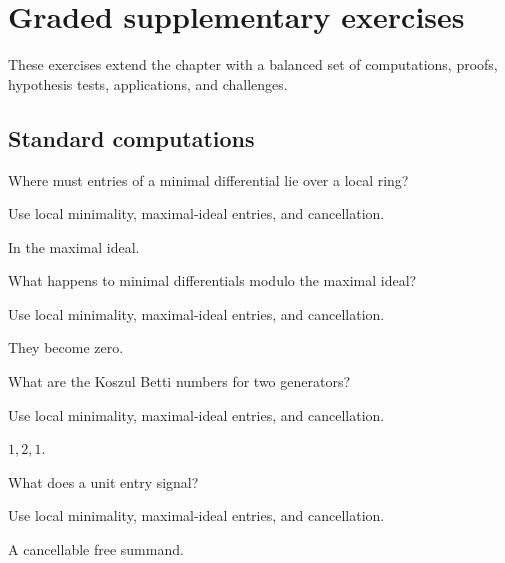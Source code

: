 \section{Graded supplementary exercises}
These exercises extend the chapter with a balanced set of computations, proofs, hypothesis tests, applications, and challenges.

\subsection*{Standard computations}

\begin{exercise}\label{exr:v25-expand-01}
Where must entries of a minimal differential lie over a local ring?
\end{exercise}
\begin{hint}
Use local minimality, maximal-ideal entries, and cancellation.
\end{hint}
\begin{solution}
In the maximal ideal.
\end{solution}

\begin{exercise}[Reduction]\label{exr:v25-expand-02}
What happens to minimal differentials modulo the maximal ideal?
\end{exercise}
\begin{hint}
Use local minimality, maximal-ideal entries, and cancellation.
\end{hint}
\begin{solution}
They become zero.
\end{solution}

\begin{exercise}\label{exr:v25-expand-03}
What are the Koszul Betti numbers for two generators?
\end{exercise}
\begin{hint}
Use local minimality, maximal-ideal entries, and cancellation.
\end{hint}
\begin{solution}
$1,2,1$.
\end{solution}

\begin{exercise}\label{exr:v25-expand-04}
What does a unit entry signal?
\end{exercise}
\begin{hint}
Use local minimality, maximal-ideal entries, and cancellation.
\end{hint}
\begin{solution}
A cancellable free summand.
\end{solution}

